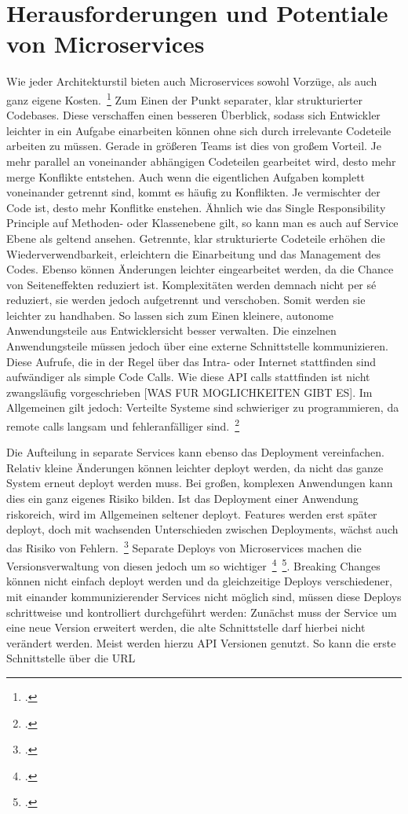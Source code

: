 \section{Herausforderungen und Potentiale von Microservices}
Wie jeder Architekturstil bieten auch Microservices sowohl Vorzüge, als auch ganz eigene Kosten.~\footcite[vgl.][]{Fowler:Guide} 
Zum Einen der Punkt separater, klar strukturierter Codebases. Diese verschaffen einen besseren Überblick, sodass sich Entwickler leichter in ein Aufgabe einarbeiten können ohne sich durch irrelevante Codeteile arbeiten zu müssen. Gerade in größeren Teams ist dies von großem Vorteil. Je mehr parallel an voneinander abhängigen Codeteilen gearbeitet wird, desto mehr merge Konflikte entstehen. Auch wenn die eigentlichen Aufgaben komplett voneinander getrennt sind, kommt es häufig zu Konflikten. Je vermischter der Code ist, desto mehr Konflitke enstehen. Ähnlich wie das Single Responsibility Principle auf Methoden- oder Klassenebene gilt, so kann man es auch auf Service Ebene als geltend ansehen. Getrennte, klar strukturierte Codeteile erhöhen die Wiederverwendbarkeit, erleichtern die Einarbeitung und das Management des Codes. Ebenso können Änderungen leichter eingearbeitet werden, da die Chance von Seiteneffekten reduziert ist. Komplexitäten werden demnach nicht per sé reduziert, sie werden jedoch aufgetrennt und verschoben. Somit werden sie leichter zu handhaben.
So lassen sich zum Einen kleinere, autonome Anwendungsteile aus Entwicklersicht besser verwalten. Die einzelnen Anwendungsteile müssen jedoch über eine externe Schnittstelle kommunizieren. Diese Aufrufe, die in der Regel über das Intra- oder Internet stattfinden sind aufwändiger als simple Code Calls. Wie diese API calls stattfinden ist nicht zwangsläufig vorgeschrieben [WAS FUR MOGLICHKEITEN GIBT ES]. Im Allgemeinen gilt jedoch: Verteilte Systeme sind schwieriger zu programmieren, da remote calls langsam und fehleranfälliger sind.~\footcite[vgl.][]{Fowler:Guide}

Die Aufteilung in separate Services kann ebenso das Deployment vereinfachen. Relativ kleine Änderungen können leichter deployt werden, da nicht das ganze System erneut deployt werden muss. Bei großen, komplexen Anwendungen kann dies ein ganz eigenes Risiko bilden. Ist das Deployment einer Anwendung riskoreich, wird im Allgemeinen seltener deployt. Features werden erst später deployt, doch mit wachsenden Unterschieden zwischen Deployments, wächst auch das Risiko von Fehlern.~\footcite[vgl.][Seite 6]{newman2015building}
Separate Deploys von Microservices machen die Versionsverwaltung von diesen jedoch um so wichtiger~\footcite[vgl.][Seite 62]{newman2015building}~\footcite[vgl.][]{Vergleichsartikel}. Breaking Changes können nicht einfach deployt werden und da gleichzeitige Deploys verschiedener, mit einander kommunizierender Services nicht möglich sind, müssen diese Deploys schrittweise und kontrolliert durchgeführt werden: Zunächst muss der Service um eine neue Version erweitert werden, die alte Schnittstelle darf hierbei nicht verändert werden. Meist werden hierzu API Versionen genutzt. So kann die erste Schnittstelle über die URL

